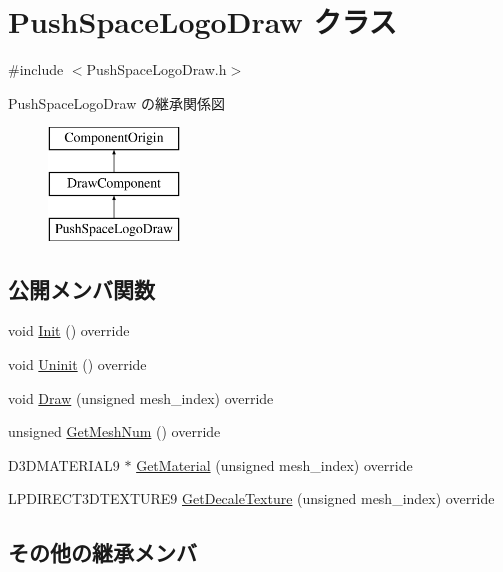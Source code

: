 \hypertarget{class_push_space_logo_draw}{}\section{Push\+Space\+Logo\+Draw クラス}
\label{class_push_space_logo_draw}


{\ttfamily \#include $<$Push\+Space\+Logo\+Draw.\+h$>$}

Push\+Space\+Logo\+Draw の継承関係図\begin{figure}[H]
\begin{center}
\leavevmode
\includegraphics[height=3.000000cm]{class_push_space_logo_draw}
\end{center}
\end{figure}
\subsection*{公開メンバ関数}
\begin{DoxyCompactItemize}
\item 
void \mbox{\hyperlink{class_push_space_logo_draw_a7ad3fe53d9bda4ea16c958bc102ff54e}{Init}} () override
\item 
void \mbox{\hyperlink{class_push_space_logo_draw_a79021c1df43968d6008de74126d53fba}{Uninit}} () override
\item 
void \mbox{\hyperlink{class_push_space_logo_draw_a4d0e48e3770a3906bd7d0a607e36a5b5}{Draw}} (unsigned mesh\+\_\+index) override
\item 
unsigned \mbox{\hyperlink{class_push_space_logo_draw_ac6e2e4f3158976693efaa2c1f351050f}{Get\+Mesh\+Num}} () override
\item 
D3\+D\+M\+A\+T\+E\+R\+I\+A\+L9 $\ast$ \mbox{\hyperlink{class_push_space_logo_draw_a701fe2023e593a2b8662699e8c97c2ea}{Get\+Material}} (unsigned mesh\+\_\+index) override
\item 
L\+P\+D\+I\+R\+E\+C\+T3\+D\+T\+E\+X\+T\+U\+R\+E9 \mbox{\hyperlink{class_push_space_logo_draw_a6823730591c0243b49171cf82ed0f065}{Get\+Decale\+Texture}} (unsigned mesh\+\_\+index) override
\end{DoxyCompactItemize}
\subsection*{その他の継承メンバ}


